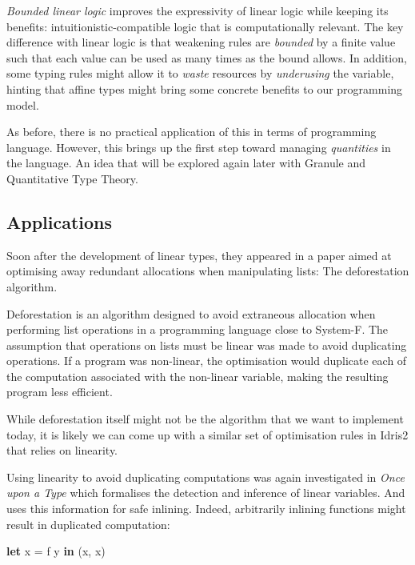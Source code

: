 \documentclass[
]{article}
\newenvironment{Shaded}{}{}
\newcommand{\KeywordTok}[1]{\textcolor[rgb]{0.00,0.44,0.13}{\textbf{#1}}}
\newcommand{\NormalTok}[1]{#1}
\newcommand{\OtherTok}[1]{\textcolor[rgb]{0.00,0.44,0.13}{#1}}
\begin{document}
\emph{Bounded linear logic}\cite{bll} improves the expressivity of
linear logic while keeping its benefits: intuitionistic-compatible logic
that is computationally relevant. The key difference with linear logic
is that weakening rules are \emph{bounded} by a finite value such that
each value can be used as many times as the bound allows. In addition,
some typing rules might allow it to \emph{waste} resources by
\emph{underusing} the variable, hinting that affine types might bring
some concrete benefits to our programming model.

As before, there is no practical application of this in terms of
programming language. However, this brings up the first step toward
managing \emph{quantities} in the language. An idea that will be
explored again later with
Granule\cite{granule}\cite{effect_coeffects_grading}\cite{graded_monads_rings}\cite{monads_and_effects}
and Quantitative Type Theory\cite{qtt}\cite{nuttin}.

\hypertarget{applications}{%
\subsection{Applications}\label{applications}}

Soon after the development of linear types, they appeared in a paper
aimed at optimising away redundant allocations when manipulating lists:
The deforestation algorithm.

Deforestation\cite{deforestation} is an algorithm designed to avoid
extraneous allocation when performing list operations in a programming
language close to System-F. The assumption that operations on lists must
be linear was made to avoid duplicating operations. If a program was
non-linear, the optimisation would duplicate each of the computation
associated with the non-linear variable, making the resulting program
less efficient.

While deforestation itself might not be the algorithm that we want to
implement today, it is likely we can come up with a similar set of
optimisation rules in Idris2 that relies on linearity.

Using linearity to avoid duplicating computations was again investigated
in \emph{Once upon a Type}\cite{once_upon_a_type} which formalises the
detection and inference of linear variables. And uses this information
for safe inlining. Indeed, arbitrarily inlining functions might result
in duplicated computation:

\begin{Shaded}
\begin{Highlighting}[]
\KeywordTok{let}\NormalTok{ x }\OtherTok{=}\NormalTok{ f y }\KeywordTok{in}
\NormalTok{    (x, x)}
\end{Highlighting}
\end{Shaded}
\end{document}
